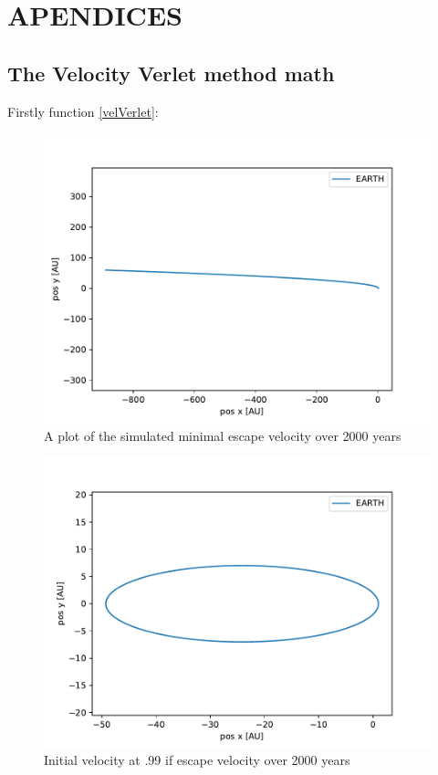 \documentclass[a4paper]{article}
\begin{document}
\section{APENDICES}

\subsection{The Velocity Verlet method math}\label{vVerlet_math}

Firstly function \ref{velVerlet}:
\begin{figure}[h!]
	\centering 
	\includegraphics[scale=0.7]{escapeVelocity2000.pdf}
	\caption{A plot of the simulated minimal escape velocity over 2000 years}
	\label{escape_vel}
\end{figure}

\begin{figure}[h!]
	\centering 
	\includegraphics[scale=0.7]{allmostEscapeVelocity2000.pdf}
	\caption{Initial velocity at .99 if escape velocity over 2000 years}
	\label{nescape_vel}
\end{figure}
\end{document}
